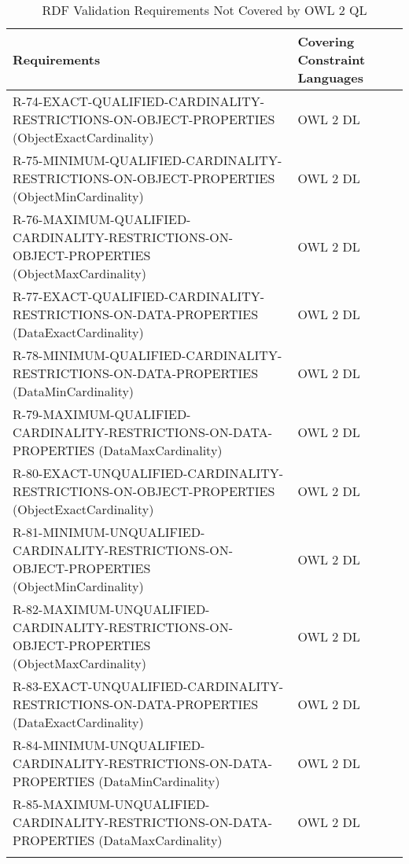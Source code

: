 \documentclass{llncs}
\newcommand{\hr}{\hline\noalign{\smallskip}} %
\begin{document}
\begin{table}
\caption{RDF Validation Requirements Not Covered by OWL 2 QL}
\label{tab:RequirementsNotCoveredOWL2QL-2}
\centering
\begin{tabular}{ll}
\hr
Requirements & Covering Constraint Languages \\
\hr
R-74-EXACT-QUALIFIED-CARDINALITY-RESTRICTIONS-ON-OBJECT-PROPERTIES (ObjectExactCardinality) & OWL 2 DL \\
R-75-MINIMUM-QUALIFIED-CARDINALITY-RESTRICTIONS-ON-OBJECT-PROPERTIES (ObjectMinCardinality) & OWL 2 DL \\
R-76-MAXIMUM-QUALIFIED-CARDINALITY-RESTRICTIONS-ON-OBJECT-PROPERTIES (ObjectMaxCardinality) & OWL 2 DL \\
R-77-EXACT-QUALIFIED-CARDINALITY-RESTRICTIONS-ON-DATA-PROPERTIES (DataExactCardinality) & OWL 2 DL \\
R-78-MINIMUM-QUALIFIED-CARDINALITY-RESTRICTIONS-ON-DATA-PROPERTIES (DataMinCardinality) & OWL 2 DL \\
R-79-MAXIMUM-QUALIFIED-CARDINALITY-RESTRICTIONS-ON-DATA-PROPERTIES (DataMaxCardinality) & OWL 2 DL \\
R-80-EXACT-UNQUALIFIED-CARDINALITY-RESTRICTIONS-ON-OBJECT-PROPERTIES (ObjectExactCardinality) & OWL 2 DL \\
R-81-MINIMUM-UNQUALIFIED-CARDINALITY-RESTRICTIONS-ON-OBJECT-PROPERTIES (ObjectMinCardinality) & OWL 2 DL \\
R-82-MAXIMUM-UNQUALIFIED-CARDINALITY-RESTRICTIONS-ON-OBJECT-PROPERTIES (ObjectMaxCardinality) & OWL 2 DL \\
R-83-EXACT-UNQUALIFIED-CARDINALITY-RESTRICTIONS-ON-DATA-PROPERTIES (DataExactCardinality) & OWL 2 DL \\
R-84-MINIMUM-UNQUALIFIED-CARDINALITY-RESTRICTIONS-ON-DATA-PROPERTIES (DataMinCardinality) & OWL 2 DL \\
R-85-MAXIMUM-UNQUALIFIED-CARDINALITY-RESTRICTIONS-ON-DATA-PROPERTIES (DataMaxCardinality) & OWL 2 DL \\
\hr
\end{tabular}
\end{table}
\end{document}
